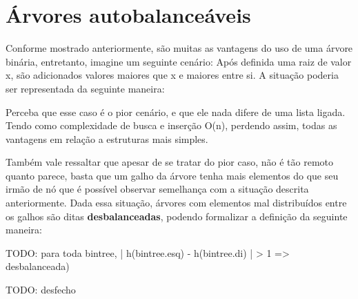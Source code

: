 \chapter{Árvores autobalanceáveis}
\label{ch:auto_bal} %

%
Conforme mostrado anteriormente, são muitas as vantagens do uso de uma árvore binária, entretanto, imagine um seguinte cenário: Após definida uma raiz de valor x, são adicionados valores maiores que x e maiores entre si. A situação poderia ser representada da seguinte maneira:


Perceba que esse caso é o pior cenário, e que ele nada difere de uma lista ligada. Tendo como complexidade de busca e inserção O(n), perdendo assim, todas as vantagens em relação a estruturas mais simples.

Também vale ressaltar que apesar de se tratar do pior caso, não é tão remoto quanto parece, basta que um galho da árvore tenha mais elementos do que seu irmão de nó que é possível observar semelhança com a situação descrita anteriormente. Dada essa situação, árvores com elementos mal distribuídos entre os galhos são ditas \textbf{desbalanceadas}, podendo formalizar a definição da seguinte maneira:

TODO: para toda bintree, | h(bintree.esq) - h(bintree.di) | > 1 => desbalanceada)

TODO: desfecho


\newpage
%
% 
